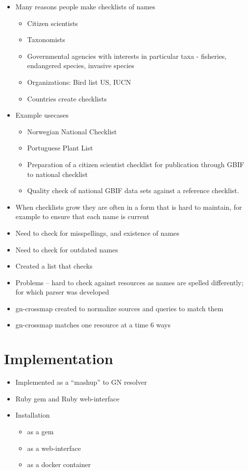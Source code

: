 \documentclass{bmcart}
\begin{document}
  \begin{itemize}

  \item Many reasons people make checklists of names
    \begin{itemize}
      \item Citizen scientists
      \item Taxonomists
      \item Governmental agencies with interests in particular taxa - fisheries, endangered species, invasive species
      \item Organizations: Bird list US, IUCN
      \item Countries create checklists
    \end{itemize}
  \item Example usecases 
    \begin{itemize}
      \item Norwegian National Checklist
      \item Portuguese Plant List
      \item Preparation of a citizen scientist checklist for publication
        through GBIF to national checklist
      \item Quality check of national GBIF data sets against a reference
        checklist.
    \end{itemize}
  \item When checklists grow they are often in a form that is hard to maintain, for example to ensure that each name is current
  \item Need to check for misspellings, and existence of names
  \item Need to check for outdated names
  \item Created a list that checks
  \item Problems -- hard to check against resources as names are spelled
    differently; for which parser was developed
  \item gn-crossmap created to normalize sources and queries to match them
  \item gn-crossmap matches one resource at a time 6 ways
\end{itemize}

\section*{Implementation}
\begin{itemize}
  \item Implemented as a ``mashup'' to GN resolver
  \item Ruby gem and Ruby web-interface
  \item Installation
    \begin{itemize}
      \item as a gem
      \item as a web-interface
      \item as a docker container
    \end{itemize}
\end{itemize}
\end{document}
